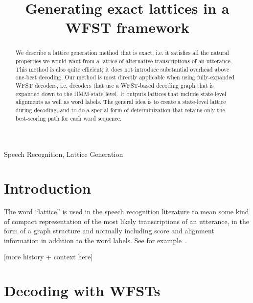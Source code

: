 \documentclass{article}
\title{Generating exact lattices in a WFST framework}
\begin{document}
\ninept  
%
\maketitle
%
\pagestyle{plain} %

\begin{abstract}
We describe a lattice generation method that is exact, i.e. it satisfies all the 
natural properties we would want from a lattice of alternative transcriptions of
an utterance.  This method is also quite efficient; it does not 
introduce substantial overhead above one-best decoding.  Our method is
most directly applicable when using fully-expanded WFST decoders, i.e. decoders that use a
WFST-based decoding graph that is expanded down to the HMM-state level.  It outputs
lattices that include state-level alignments as well as word labels.
The general idea is to create a state-level lattice during decoding, and to do
a special form of determinization that retains only the best-scoring path
for each word sequence.
\end{abstract}

\begin{keywords}
  Speech Recognition, Lattice Generation
\end{keywords}

\section{Introduction}

The word ``lattice'' is used in the speech recognition literature to mean some
kind of compact representation of the most likely transcriptions of an utterance,
in the form of a graph structure and normally including score and alignment
information in addition to the word labels.  See 
for example~\cite{efficient_general,ney_word_graph,odell_thesis,saon2005anatomy}.

[more history + context here]



\section{Decoding with WFSTs}
\end{document}
